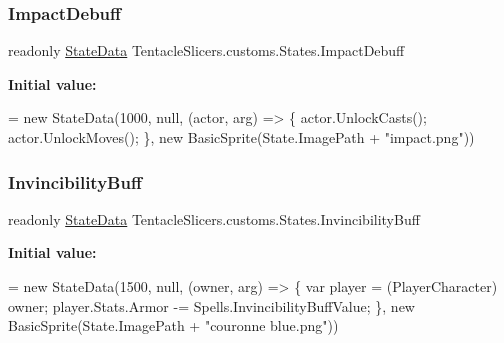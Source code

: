 \subsubsection{\texorpdfstring{Impact\+Debuff}{ImpactDebuff}}
{\footnotesize\ttfamily readonly \hyperlink{class_tentacle_slicers_1_1states_1_1_state_data}{State\+Data} Tentacle\+Slicers.\+customs.\+States.\+Impact\+Debuff\hspace{0.3cm}{\ttfamily [static]}}

{\bfseries Initial value\+:}
\begin{DoxyCode}
= \textcolor{keyword}{new} StateData(1000, null, (actor, arg) =>
        \{
            actor.UnlockCasts();
            actor.UnlockMoves();
        \}, \textcolor{keyword}{new} BasicSprite(State.ImagePath + \textcolor{stringliteral}{"impact.png"}))
\end{DoxyCode}
\mbox{\label{class_tentacle_slicers_1_1customs_1_1_states_a64a08a2e84c0fc66749ea14dc6dbed5b}} 
\subsubsection{\texorpdfstring{Invincibility\+Buff}{InvincibilityBuff}}
{\footnotesize\ttfamily readonly \hyperlink{class_tentacle_slicers_1_1states_1_1_state_data}{State\+Data} Tentacle\+Slicers.\+customs.\+States.\+Invincibility\+Buff\hspace{0.3cm}{\ttfamily [static]}}

{\bfseries Initial value\+:}
\begin{DoxyCode}
= \textcolor{keyword}{new} StateData(1500, null, (owner, arg) =>
        \{
            var player = (PlayerCharacter) owner;
            player.Stats.Armor -= Spells.InvincibilityBuffValue;
        \}, \textcolor{keyword}{new} BasicSprite(State.ImagePath + \textcolor{stringliteral}{"couronne blue.png"}))
\end{DoxyCode}
\mbox{\label{class_tentacle_slicers_1_1customs_1_1_states_a1d9623b6ccb8a77f208aa593513916af}} 
